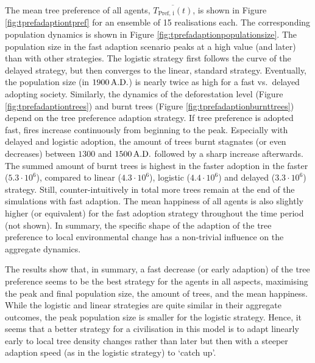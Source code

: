 The mean tree preference of all agents, $\overline{T_\text{Pref, i}(t)}$, is shown in Figure \ref{fig:tprefadaptiontpref} for an ensemble of 15 realisations each.
The corresponding population dynamics is shown in Figure \ref{fig:tprefadaptionpopulationsize}.
The population size in the fast adaption scenario peaks at a high value (and later) than with other strategies.
The logistic strategy first follows the curve of the  delayed strategy, but then converges to the linear, standard strategy.
Eventually, the population size (in $1900\, {\rm A.D.}$) is nearly twice as high for a fast vs.\ delayed adopting society.
Similarly, the dynamics of the deforestation level (Figure \ref{fig:tprefadaptiontrees}) and burnt trees (Figure \ref{fig:tprefadaptionburnttrees}) depend on the tree preference adaption strategy. 
If tree preference is adopted fast, fires increase continuously from beginning to the peak. 
Especially with delayed and logistic adoption, the amount of trees burnt stagnates (or even decreases) between $1300$ and $1500\,{\rm A.D.}$ followed by a sharp increase afterwards.
The summed amount of burnt trees is highest in the faster adoption in the faster ($5.3\cdot 10^6$), compared to linear ($4.3\cdot 10^6$), logistic ($4.4\cdot 10^6$) and delayed ($3.3\cdot 10^6$) strategy.
Still, counter-intuitively in total more trees remain at the end of the simulations with fast adaption.
The mean happiness of all agents is also slightly higher (or equivalent) for the fast adoption strategy throughout the time period (not shown).
In summary, the specific shape of the adaption of the tree preference to local environmental change has a non-trivial influence on the aggregate dynamics.

The results show that, in summary, a fast decrease (or early adaption) of the tree preference seems to be the best strategy for the agents in all aspects, maximising the peak and final population size, the amount of trees, and the mean happiness.
While the logistic and linear strategies are quite similar in their aggregate outcomes, the peak population size is smaller for the logistic strategy.
Hence, it seems that a better strategy for a civilisation in this model is to adapt linearly early to local tree density changes rather than later but then  with a steeper adaption speed (as in the logistic strategy) to `catch up'.

